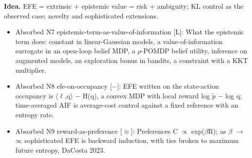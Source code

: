 \documentclass[10pt]{article}
\begin{document}
\textbf{Idea.} EFE = extrinsic + epistemic value = risk + ambiguity; KL control as the observed case; novelty and sophisticated extensions.
\begin{itemize}[nosep,leftmargin=1.2em]
\item Absorbed N7 epistemic-term-as-value-of-information [L]: What the epistemic term does: constant in linear-Gaussian models, a value-of-information surrogate in an open-loop belief MDP, a \ensuremath{\rho}-POMDP belief utility, inference on augmented models, an exploration bonus in bandits, a constraint with a KKT multiplier.
\item Absorbed N8 efe-on-occupancy [\ensuremath{-}]: EFE written on the state-action occupancy is \ensuremath{\langle}\ensuremath{\ell},q\ensuremath{\rangle} \ensuremath{-} H(q), a convex MDP with local reward log \ensuremath{\tilde{p}} \ensuremath{-} log q; time-averaged AIF is average-cost control against a fixed reference with an entropy rate.
\item Absorbed N9 reward-as-preference [\ensuremath{\approx}]: Preferences C \ensuremath{\propto} exp(\ensuremath{\beta}R); as \ensuremath{\beta} \ensuremath{\to} \ensuremath{\infty} sophisticated EFE is backward induction, with ties broken to maximum future entropy, DaCosta 2023.
\end{itemize}
\end{document}
